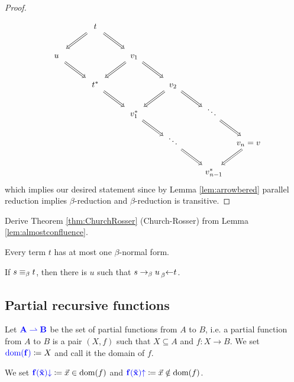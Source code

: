 \begin{proof}
\begin{equation*}
\begin{tikzcd}[/tikz/cells={/tikz/nodes={shape=asymmetrical
            rectangle,text width=0.5cm,text height=2ex,text depth=0.3ex,align=center}}]
            & t \ar[dl, Rightarrow] \ar[dr, Rightarrow] & \\
            u \ar[dr, Rightarrow] && v_1 \ar[dr, Rightarrow] \ar[dl, Rightarrow] \\
            & t^* \ar[dr, Rightarrow] && v_2 \ar[dr, Rightarrow] \ar[dl, Rightarrow] \\
            && v_1^* \ar[dr, Rightarrow] && \ddots \ar[dr, Rightarrow] \\
            &&& \ddots \ar[dr, Rightarrow] && \mathllap{v_n} = \mathrlap{v} \ar[dl, Rightarrow]\\
            &&&&\mathllap{v}_{n\mathrlap{-1}}^*
        \end{tikzcd}
    \end{equation*}
    which implies our desired statement since by Lemma \ref{lem:arrowbered} parallel reduction implies $\beta$-reduction and $\beta$-reduction is transitive.
\end{proof}

\begin{exercise}
    Derive Theorem \ref{thm:ChurchRosser} (Church-Rosser) from Lemma \ref{lem:almostconfluence}.
\end{exercise}

\begin{boxcor}
    Every term $t$ has at most one $\beta$-normal form.
\end{boxcor}

\begin{boxcor}
    If $s \equiv_{\beta} t$, then there is $u$ such that $s \to_{\beta} u \prescript{}{\beta}{\leftarrow} t$.
\end{boxcor}

\subsection{Partial recursive functions}

\begin{boxdefi}
    Let $\alert{A \rightharpoonup B}$ be the set of \alert{partial functions} from $A$ to $B$, i.e. a partial function from $A$ to $B$ is a pair $(X, f)$ such that $X \subseteq A$ and $f \colon X \to B$.
    We set $\alert{\domain{f}} \coloneq X$ and call it the \alert{domain} of $f$.
\end{boxdefi}

\begin{notation}
    We set $\alert{f(\vec{x})\down} \coloneq \vec{x} \in \domain{f}$ and $\alert{f(\vec{x})\up} \coloneq \vec{x} \notin \domain{f}$.
\end{notation}


